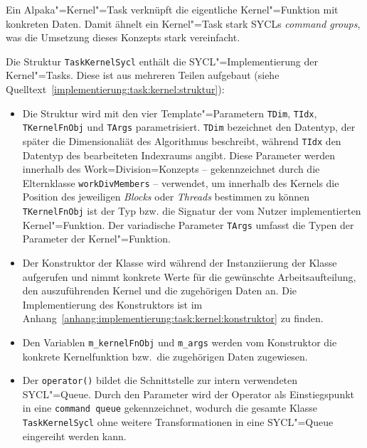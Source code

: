 Ein Alpaka"=Kernel"=Task verknüpft die eigentliche Kernel"=Funktion mit
konkreten Daten. Damit ähnelt ein Kernel"=Task stark SYCLs
\textit{command groups}, was die Umsetzung dieses Konzepts stark vereinfacht.

Die Struktur \texttt{TaskKernelSycl} enthält die SYCL"=Implementierung der
Kernel"=Tasks. Diese ist aus mehreren Teilen aufgebaut (siehe
Quelltext~\ref{implementierung:task:kernel:struktur}):

\begin{itemize}
    \item Die Struktur wird mit den vier Template"=Parametern \texttt{TDim},
          \texttt{TIdx}, \texttt{TKernelFnObj} und \texttt{TArgs}
          parametrisiert. \texttt{TDim} bezeichnet den Datentyp, der später die
          Dimensionaliät des Algorithmus beschreibt, während \texttt{TIdx} den
          Datentyp des bearbeiteten Indexraums angibt. Diese Parameter werden
          innerhalb des Work=Division=Konzepts -- gekennzeichnet durch die
          Elternklasse \texttt{workDivMembers} -- verwendet, um innerhalb des
          Kernels die Position des jeweiligen \textit{Blocks} oder
          \textit{Threads} bestimmen zu können \texttt{TKernelFnObj} ist der Typ
          bzw. die Signatur der vom Nutzer implementierten Kernel"=Funktion. Der
          variadische Parameter \texttt{TArgs} umfasst die Typen der Parameter
          der Kernel"=Funktion.
    \item Der Konstruktor der Klasse wird während der Instanziierung der Klasse
          aufgerufen und nimmt konkrete Werte für die gewünschte
          Arbeitsaufteilung, den auszuführenden Kernel und die zugehörigen Daten
          an. Die Implementierung des Konstruktors ist im
          Anhang~\ref{anhang:implementierung:task:kernel:konstruktor} zu finden.
    \item Den Variablen \texttt{m\_kernelFnObj} und \texttt{m\_args} werden vom
          Konstruktor die konkrete Kernelfunktion bzw.\ die zugehörigen Daten
          zugewiesen.
    \item Der \texttt{operator()} bildet die Schnittstelle zur intern
          verwendeten SYCL"=Queue. Durch den Parameter wird der Operator als
          Einstiegspunkt in eine \texttt{command queue} gekennzeichnet, wodurch
          die gesamte Klasse \texttt{TaskKernelSycl} ohne weitere
          Transformationen in eine SYCL"=Queue eingereiht werden kann.
\end{itemize}

